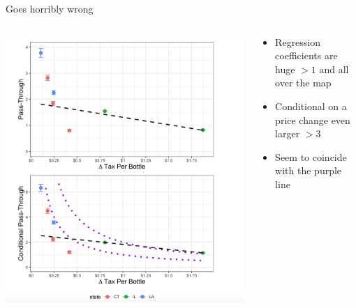 \begin{frame}{Goes horribly wrong}
\begin{columns}
\begin{column}{0.4\textwidth}
\includegraphics[height=0.9\textheight]{resources/cr_1.png}
\end{column}
\begin{column}{0.5\textwidth}
\begin{itemize}
\item Regression coefficients are huge $>1$ and all over the map
\item Conditional on a price change even larger $>3$
\item Seem to coincide with the purple line 
\end{itemize}
\end{column}
\end{columns}
\end{frame}


